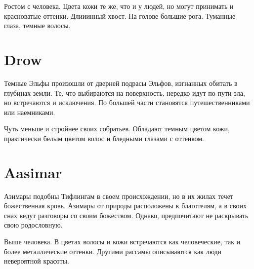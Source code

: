 \documentclass[a5paper,11pt]{book}
\begin{document}
\begin{multicols}{2}
Ростом с человека. Цвета кожи те же, что и у людей, но могут принимать и красноватые оттенки. Длииинный хвост. На голове большие рога. Туманные глаза, темные волосы.


%

\section{Drow}

Темные Эльфы произошли от дверней подрасы Эльфов, изгнанных обитать в глубинах земли. Те, что выбираются на поверхность, нередко идут по пути зла, но встречаются и исключения. По большей части становятся путешественниками или наемниками.

Чуть меньше и стройнее своих собратьев. Обладают темным цветом кожи, практически белым цветом волос и бледными глазами с оттенком.


\section{Aasimar}

Азимары подобны Тифлингам в своем происхождении, но в их жилах течет божественная кровь.  Азимары от природы расположены к благотелям, а в своих снах ведут разговоры со своим божеством. Однако, предпочитают не раскрывать свою родословную.

Выше человека. В цветах волосы и кожи встречаются как человеческие, так и более металлические оттенки. Другими рассамы описываются как люди невероятной красоты. 



\end{multicols}

\end{document}
